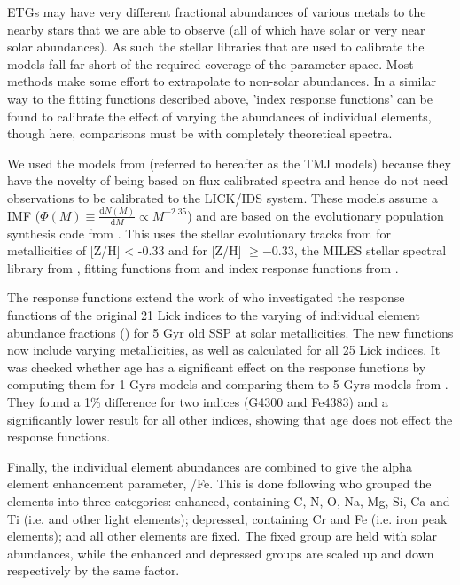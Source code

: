 		ETGs may have very different fractional abundances of various metals to the nearby stars that we are able to observe (all of which have solar or very near solar abundances). As such the stellar libraries that are used to calibrate the models fall far short of the required coverage of the parameter space. Most methods make some effort to extrapolate to non-solar abundances. In a similar way to the fitting functions described above, 'index response functions' can be found to calibrate the effect of varying the abundances of individual elements, though here, comparisons must be with completely theoretical spectra.

		We used the models from \citet{Thomas2010} (referred to hereafter as the TMJ models) because they have the novelty of being based on flux calibrated spectra and hence do not need observations to be calibrated to the LICK/IDS system. These models assume a \citet{Salpeter1955} IMF ($\Phi(M) \equiv \frac{\mathrm{d}N(M)}{\mathrm{d}M} \propto M^{-2.35}$) and are based on the evolutionary population synthesis code from \citet{Maraston1998}. This uses the stellar evolutionary tracks from \citet{Cassisi1997} for metallicities of [Z/H] < -0.33 and \citet{Girardi2000} for [Z/H] $\ge -0.33$, the MILES stellar spectral library from \citet{Sanchez-Blazquez2006a, Falcon-Barroso2011a}, fitting functions from \citet{Johansson2010} and index response functions from \citet{Korn2005}.

		The \citet{Korn2005} response functions extend the work of \citet{Tripicco1995} who investigated the response functions of the original 21 Lick indices to the varying of individual element abundance fractions () for 5 Gyr old SSP at solar metallicities. The new functions now include varying metallicities, as well as calculated for all 25 Lick indices. It was checked whether age has a significant effect on the response functions by computing them for 1 Gyrs models and comparing them to 5 Gyrs models from \citet{Tripicco1995}. They found a 1\% difference for two indices (G4300 and Fe4383) and a significantly lower result for all other indices, showing that age does not effect the response functions.

		Finally, the individual element abundances are combined to give the alpha element enhancement parameter, \textalpha/Fe. This is done following \citet{Trager2000} who grouped the elements into three categories: enhanced, containing C, N, O, Na, Mg, Si, Ca and Ti (i.e. \textalpha and other light elements); depressed, containing Cr and Fe (i.e. iron peak elements); and all other elements are fixed. The fixed group are held with solar abundances, while the enhanced and depressed groups are scaled up and down respectively by the same factor. 


